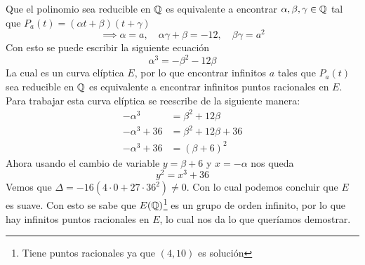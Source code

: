 \begin{sol}
	Que el polinomio sea reducible en $\mathbb{Q}$ es equivalente a encontrar $\alpha,\beta,\gamma\in\mathbb{Q}$ tal que $P_a(t)=(\alpha t+\beta)(t+\gamma)$
	\[
		\implies \alpha = a,\quad \alpha\gamma+\beta=-12,\quad \beta\gamma=a^2
	\]
	Con esto se puede escribir la siguiente ecuación
	\[
		\alpha^3=-\beta^2-12\beta
	\]
	La cual es un curva elíptica $E$, por lo que encontrar infinitos $a$ tales que $P_a(t)$ sea reducible en $\mathbb{Q}$ es equivalente a encontrar infinitos puntos racionales en $E$.\\
	Para trabajar esta curva elíptica se reescribe de la siguiente manera:
	\begin{align*}
		-\alpha^3    & =\beta^2+12\beta    \\
		-\alpha^3+36 & =\beta^2+12\beta+36 \\
		-\alpha^3+36 & =(\beta+6)^2
    \end{align*}
    Ahora usando el cambio de variable $y=\beta+6$ y $x=-\alpha$ nos queda
    \[
        y^2=x^3+36
    \]
    Vemos que $\Delta=-16(4\cdot 0+27\cdot36^2)\neq0$. Con lo cual podemos concluir que $E$ es suave. Con esto se sabe que $E(\mathbb{Q})$\footnote{Tiene puntos racionales ya que $(4,10)$ es solución} es un grupo de orden infinito, por lo que hay infinitos puntos racionales en $E$, lo cual nos da lo que queríamos demostrar.
\end{sol}

